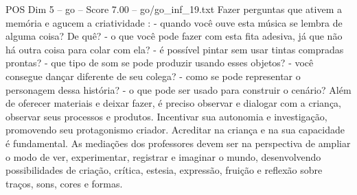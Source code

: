 \begin{textsample}{POS Dim 5 – go – Score 7.00 – go/go\_inf\_19.txt}
Fazer perguntas que ativem a memória e agucem a criatividade : - quando você ouve esta música se lembra de alguma coisa?
De quê? - o que você pode fazer com esta fita adesiva, já que não há outra coisa para colar com ela? - é possível pintar sem usar tintas compradas prontas? - que tipo de som se pode produzir usando esses objetos? - você consegue dançar diferente de seu colega? - como se pode representar o personagem dessa história? - o que pode ser usado para construir o cenário?
Além de oferecer materiais e deixar fazer, é preciso observar e dialogar com a criança, observar seus processos e produtos.
Incentivar sua autonomia e investigação, promovendo seu protagonismo criador.
Acreditar na criança e na sua capacidade é fundamental.
As mediações dos professores devem ser na perspectiva de ampliar o modo de ver, experimentar, registrar e imaginar o mundo, desenvolvendo possibilidades de criação, crítica, estesia, expressão, fruição e reflexão sobre traços, sons, cores e formas.

\end{textsample}
